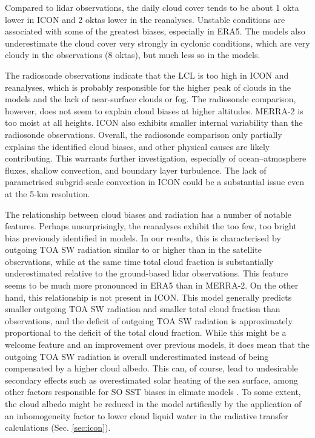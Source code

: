 \documentclass[12pt,a4paper]{article}
\begin{document}
Compared to lidar observations, the daily cloud cover tends to be about 1 okta
lower in ICON and 2 oktas lower in the reanalyses.  Unstable conditions are
associated with some of the greatest biases, especially in ERA5.  The models
also underestimate the cloud cover very strongly in cyclonic conditions, which
are very cloudy in the observations (8 oktas), but much less so in the models.

The radiosonde observations indicate that the LCL is too high in ICON and
reanalyses, which is probably responsible for the higher peak of clouds in the
models and the lack of near-surface clouds or fog. The radiosonde comparison,
however, does not seem to explain cloud biases at higher altitudes.  MERRA-2 is
too moist at all heights.  ICON also exhibits smaller internal variability than
the radiosonde observations. Overall, the radiosonde comparison only
partially explains the identified cloud biases, and other physical causes are
likely contributing.  This warrants further investigation, especially of
ocean--atmosphere fluxes, shallow convection, and boundary layer turbulence.
The lack of parametrised subgrid-scale convection in ICON could be a
substantial issue even at the 5-km resolution.

The relationship between cloud biases and radiation has a number of notable
features. Perhaps unsurprisingly, the reanalyses exhibit the too few, too
bright bias previously identified in models. In our results, this is
characterised by outgoing TOA SW radiation similar to or higher than in the
satellite observations, while at the same time total cloud fraction is
substantially underestimated relative to the ground-based lidar observations.
This feature seems to be much more pronounced in ERA5 than in MERRA-2. On the
other hand, this relationship is not present in ICON. This model generally
predicts smaller outgoing TOA SW radiation and smaller total cloud fraction
than observations, and the deficit of outgoing TOA SW radiation is
approximately proportional to the deficit of the total cloud fraction. While
this might be a welcome feature and an improvement over previous models, it
does mean that the outgoing TOA SW radiation is overall underestimated instead
of being compensated by a higher cloud albedo.  This can, of course, lead to
undesirable secondary effects such as overestimated solar heating of the sea
surface, among other factors responsible for SO SST biases in climate models
\citep{zhang2023,luo2023,hyder2018}.  To some extent, the cloud albedo might be
reduced in the model artifically by the application of an inhomogeneity factor
to lower cloud liquid water in the radiative transfer calculations (Sec.
\ref{sec:icon}).
\end{document}
